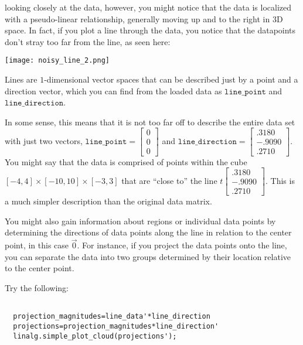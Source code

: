 \documentclass{ximera}
\begin{document}
looking closely at the data, however, you might notice that the data is localized with a pseudo-linear relationship, generally moving up and to the right in 3D space. In fact, if you plot a line through the data, you notice that the datapoints don't stray too far from the line, as seen here:

\begin{center}
  \texttt{[image: noisy\_line\_2.png]}
\end{center}

Lines are $1$-dimensional vector spaces that can be described just by a point and a direction vector, which you can find from the loaded data as $\texttt{line\_point}$ and $\texttt{line\_direction}$. 

In some sense, this means that it is not too far off to describe the entire data set with just two vectors, $\texttt{line\_point}=\begin{bmatrix}0\\0\\0\end{bmatrix}$ and $\texttt{line\_direction}=\begin{bmatrix}.3180\\-.9090\\.2710\end{bmatrix}$. You might say that the data is comprised of points within the cube $[-4,4]\times[-10,10]\times[-3,3]$ that are ``close to'' the line $t\begin{bmatrix}.3180\\-.9090\\.2710\end{bmatrix}$. This is a much simpler description than the original data matrix. 

You might also gain information about regions or individual data points by determining the directions of data points along the line in relation to the center point, in this case $\vec{0}$. For instance, if you project the data points onto the line, you can separate the data into two groups determined by their location relative to the center point. 

Try the following:

\begin{verbatim}

  projection_magnitudes=line_data'*line_direction
  projections=projection_magnitudes*line_direction'
  linalg.simple_plot_cloud(projections');

\end{verbatim}
\end{document}
